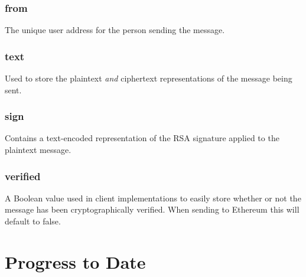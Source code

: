 \documentclass[titlepage]{report}
\begin{document}
\subsubsection{from}
The unique user address for the person sending the message.

\subsubsection{text}
Used to store the plaintext \textit{and} ciphertext representations of the message being sent.

\subsubsection{sign}
Contains a text-encoded representation of the RSA signature applied to the plaintext message.

\subsubsection{verified}
A Boolean value used in client implementations to easily store whether or not the message has been cryptographically verified. When sending to \gls{Ethereum} this will default to false.

\pagebreak

\section{Progress to Date}
\end{document}
